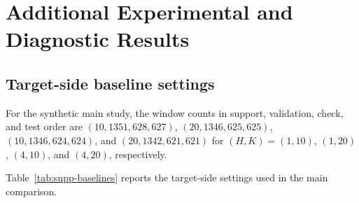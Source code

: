 \documentclass[11pt,a4paper]{article}
\begin{document}
\section{Additional Experimental and Diagnostic Results}
\label{supp:diagnostics}



\subsection{Target-side baseline settings}

For the synthetic main study, the window counts in support, validation,
check, and test order are $(10,1351,628,627)$, $(20,1346,625,625)$,
$(10,1346,624,624)$, and $(20,1342,621,621)$ for $(H,K)=(1,10)$,
$(1,20)$, $(4,10)$, and $(4,20)$, respectively.

Table~\ref{tab:supp-baselines} reports the target-side settings used in the
main comparison.
\end{document}
